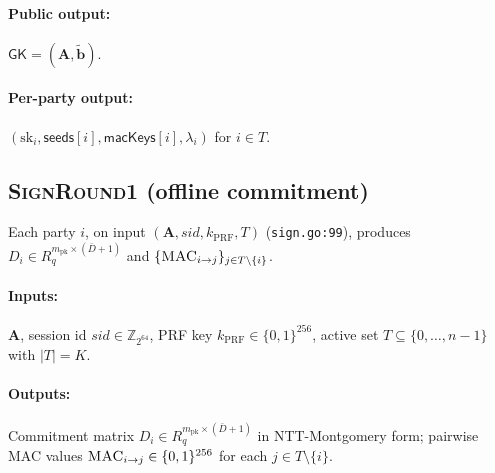 \paragraph{Public output:} $\mathsf{GK} = (\mathbf{A},
\tilde{\mathbf{b}})$. \\
\paragraph{Per-party output:} $(\mathrm{sk}_i, \mathsf{seeds}[i],
\mathsf{macKeys}[i], \lambda_i)$ for $i \in T$.

\subsection{\textsc{SignRound1} (offline commitment)}
\label{sec:protocol:round1}

Each party $i$, on input $(\mathbf{A}, \mathit{sid}, k_{\mathrm{PRF}},
T)$ (\texttt{sign.go:99}), produces $D_i \in R_q^{m_{\mathrm{pk}}
\times (\bar D + 1)}$ and $\{\textsc{MAC}_{i \to j}\}_{j \in T \setminus
\{i\}}$.

\paragraph{Inputs:} $\mathbf{A}$, session id $\mathit{sid} \in
\mathbb{Z}_{2^{64}}$, PRF key $k_{\mathrm{PRF}} \in \{0,1\}^{256}$,
active set $T \subseteq \{0, \ldots, n-1\}$ with $|T| = K$.

\paragraph{Outputs:} Commitment matrix $D_i \in R_q^{m_{\mathrm{pk}}
\times (\bar D + 1)}$ in NTT-Montgomery form; pairwise MAC values
$\textsc{MAC}_{i \to j} \in \{0,1\}^{256}$ for each $j \in T \setminus
\{i\}$.

